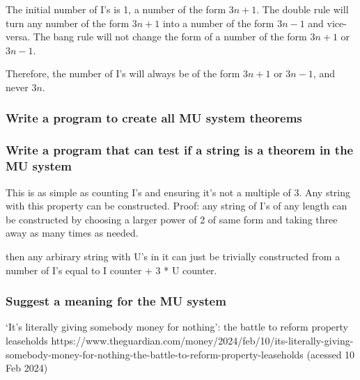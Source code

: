 \documentclass{article}
\begin{document}
The initial number of I's is 1, a number of the form $3n+1$.
The double rule will turn any number of the form $3n+1$ into
a number of the form $3n-1$ and vice-versa.
The bang rule will not change the form of a number of the form
$3n+1$ or $3n-1$.

Therefore, the number of I's will always be of the form
$3n+1$ or $3n-1$, and never $3n$.

\subsubsection{Write a program to create all MU system theorems}
\subsubsection{Write a program that can test if a string is a
theorem in the MU system}
This is as simple as counting I's and ensuring it's not a multiple of 3. Any string with this property can be constructed.
Proof: any string of I's of any length can be constructed by choosing a larger power of 2 of same form and taking three away as 
many times as needed.

then any arbirary string with U's in it can just be trivially constructed from a number of I's equal to I counter + 3 * U counter.
\subsubsection{Suggest a meaning for the MU system}

\begin{thebibliography}{}
‘It’s literally giving somebody money for nothing’: the battle to reform property leaseholds
https://www.theguardian.com/money/2024/feb/10/its-literally-giving-somebody-money-for-nothing-the-battle-to-reform-property-leaseholds
(acessed 10 Feb 2024)
\end{thebibliography}
\end{document}
